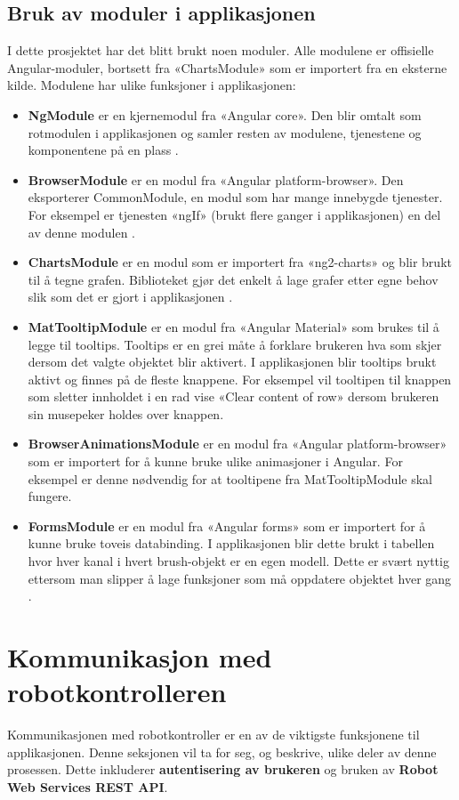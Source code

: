 \subsection{Bruk av moduler i applikasjonen}
I dette prosjektet har det blitt brukt noen moduler. Alle modulene er offisielle Angular-moduler, bortsett fra «ChartsModule» som er importert fra en eksterne kilde. Modulene har ulike funksjoner i applikasjonen:
\begin{itemize}
    \item \textbf{NgModule} er en kjernemodul fra «Angular core». Den blir omtalt som rotmodulen i applikasjonen og samler resten av modulene, tjenestene og komponentene på en plass \cite{angularModules}.
    \item \textbf{BrowserModule} er en modul fra «Angular platform-browser». Den eksporterer CommonModule, en modul som har mange innebygde tjenester. For eksempel er tjenesten «ngIf» (brukt flere ganger i applikasjonen) en del av denne modulen \cite{angular_BrowserModule}.
    \item \textbf{ChartsModule} er en modul som er importert fra «ng2-charts» og blir brukt til å tegne grafen. Biblioteket gjør det enkelt å lage grafer etter egne behov slik som det er gjort i applikasjonen \cite{angular_ChartsModule}.
    \item \textbf{MatTooltipModule} er en modul fra «Angular Material» som brukes til å legge til tooltips. Tooltips er en grei måte å forklare brukeren hva som skjer dersom det valgte objektet blir aktivert. I applikasjonen blir tooltips brukt aktivt og finnes på de fleste knappene. For eksempel vil tooltipen til knappen som sletter innholdet i en rad vise «Clear content of row» dersom brukeren sin musepeker holdes over knappen.
    \item \textbf{BrowserAnimationsModule} er en modul fra «Angular platform-browser» som er importert for å kunne bruke ulike animasjoner i Angular. For eksempel er denne nødvendig for at tooltipene fra MatTooltipModule skal fungere.
    \item \textbf{FormsModule} er en modul fra «Angular forms» som er importert for å kunne bruke toveis databinding. I applikasjonen blir dette brukt i tabellen hvor hver kanal i hvert brush-objekt er en egen modell. Dette er svært nyttig ettersom man slipper å lage funksjoner som må oppdatere objektet hver gang \cite{angular_FormsModule}.
\end{itemize}

\section{Kommunikasjon med robotkontrolleren}
Kommunikasjonen med robotkontroller er en av de viktigste funksjonene til applikasjonen. Denne seksjonen vil ta for seg, og beskrive, ulike deler av denne prosessen. Dette inkluderer \textbf{autentisering av brukeren} og bruken av \textbf{Robot Web Services REST API}.

